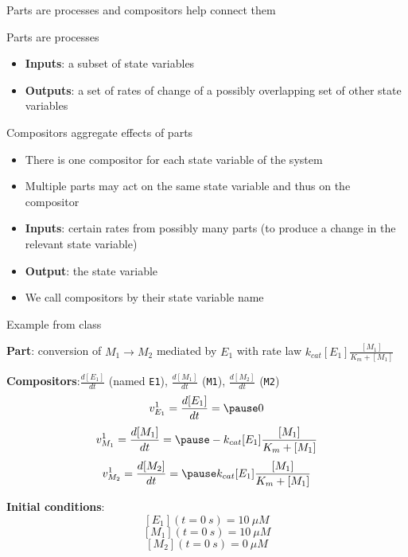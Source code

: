 \documentclass[handout]{beamer} %
\newcommand{\br}{\vspace{\baselineskip}}
\begin{document}
\begin{frame}{Parts are processes and compositors help connect them}

Parts are processes

\begin{itemize}
	\item \textbf{Inputs}: a subset of state variables
	\item \textbf{Outputs}: a set of rates of change of a possibly overlapping set of other state variables
\end{itemize}

\pause

Compositors aggregate effects of parts

\begin{itemize}
	\item There is one compositor for each state variable of the system
	\item Multiple parts may act on the same state variable and thus on the compositor \pause
	\item \textbf{Inputs}: certain rates from possibly many parts (to produce a change in the relevant state variable)
	\item \textbf{Output}: the state variable \pause
	\item We call compositors by their state variable name
\end{itemize}

\end{frame}

\begin{frame}{Example from class}

\textbf{Part}: conversion of $M_1 \rightarrow M_2$ mediated by $E_1$ with rate law $k_{cat} [E_1] \frac{[M_1]}{K_m + [M_1]}$

\pause
\br

\textbf{Compositors}:\pause $\frac{d[E_1]}{dt}$ (named \texttt{E1}), $\frac{d[M_1]}{dt}$ (\texttt{M1}), $\frac{d[M_2]}{dt}$ (\texttt{M2})\pause
$$ v_{E_1}^1 = \frac{d[E_1]}{dt} = \pause0 $$
$$ v_{M_1}^1 = \frac{d[M_1]}{dt} = \pause- k_{cat} [E_1] \frac{[M_1]}{K_m + [M_1]} $$
$$ v_{M_2}^1 = \frac{d[M_2]}{dt} = \pause  k_{cat} [E_1] \frac{[M_1]}{K_m + [M_1]} $$

\pause

\textbf{Initial conditions}:
$$ [E_1] (t = 0~s) = 10~\mu M$$
$$ [M_1] (t = 0~s) = 10~\mu M$$
$$ [M_2] (t = 0~s) = 0~\mu M$$

\end{frame}
\end{document}
